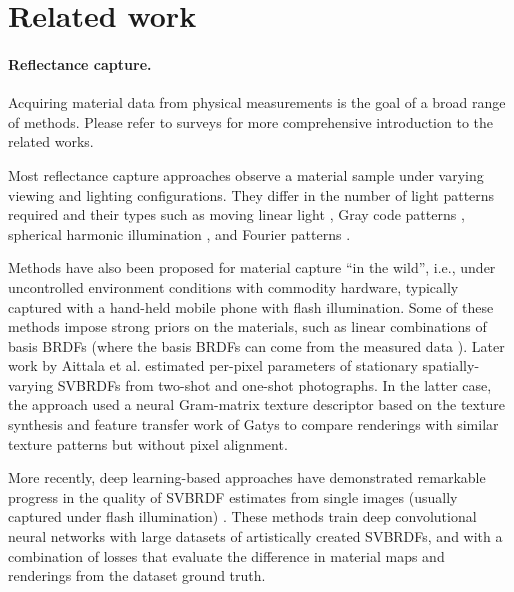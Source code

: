 \section{Related work}
\label{sec:svbrdf:related}

\paragraph{Reflectance capture.}

Acquiring material data from physical measurements is the goal of a broad range of methods.
Please refer to surveys \cite{weyrich2009principles,guarnera2016brdf,dong2019deep} for more comprehensive introduction to the related works.

Most reflectance capture approaches observe a material sample under varying viewing and lighting configurations. They differ in the number of light patterns required and their types such as moving linear light \cite{gardner2003linear,ren2011pocket}, Gray code patterns \cite{guarnera2016brdf}, spherical harmonic illumination \cite{ghosh2009estimating}, and Fourier patterns \cite{aittala2013practical}.

Methods have also been proposed for material capture ``in the wild'', i.e., under uncontrolled environment conditions with commodity hardware, typically captured with a hand-held mobile phone with flash illumination. Some of these methods impose strong priors on the materials, such as linear combinations of basis BRDFs \cite{hui2017reflectance,xu2016minimal} (where the basis BRDFs can come from the measured data \cite{matusik2003data}). Later work by Aittala et al. \cite{aittala2015two,aittala2016reflectance} estimated per-pixel parameters of stationary spatially-varying SVBRDFs from two-shot and one-shot photographs.
In the latter case, the approach used a neural Gram-matrix texture descriptor based on the texture synthesis and feature transfer work of Gatys \cite{gatys2015neural,gatys2016image} to compare renderings with similar texture patterns but without pixel alignment.

More recently, deep learning-based approaches have demonstrated remarkable progress in the quality of SVBRDF estimates from single images (usually captured under flash illumination) \cite{li2017modeling,deschaintre2018single,li2018materials}. These methods train deep convolutional neural networks with large datasets of artistically created SVBRDFs, and with a combination of losses that evaluate the difference in material maps and renderings from the dataset ground truth.


